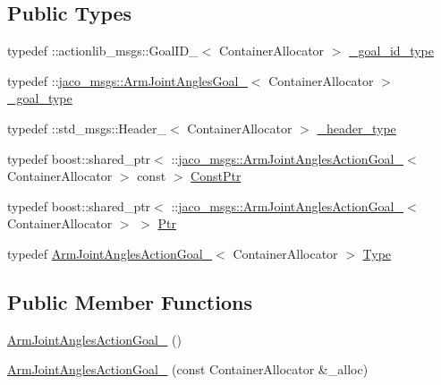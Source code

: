 \subsection*{Public Types}
\begin{DoxyCompactItemize}
\item 
typedef \+::actionlib\+\_\+msgs\+::\+Goal\+I\+D\+\_\+$<$ Container\+Allocator $>$ \hyperlink{structjaco__msgs_1_1ArmJointAnglesActionGoal___aa65aa60f77df79b587a07808da34d260}{\+\_\+goal\+\_\+id\+\_\+type}
\item 
typedef \+::\hyperlink{structjaco__msgs_1_1ArmJointAnglesGoal__}{jaco\+\_\+msgs\+::\+Arm\+Joint\+Angles\+Goal\+\_\+}$<$ Container\+Allocator $>$ \hyperlink{structjaco__msgs_1_1ArmJointAnglesActionGoal___a9db4408e5eda0965ab7c3334e53a7a24}{\+\_\+goal\+\_\+type}
\item 
typedef \+::std\+\_\+msgs\+::\+Header\+\_\+$<$ Container\+Allocator $>$ \hyperlink{structjaco__msgs_1_1ArmJointAnglesActionGoal___a43ebc2f136a276a4506784e53fd194ae}{\+\_\+header\+\_\+type}
\item 
typedef boost\+::shared\+\_\+ptr$<$ \+::\hyperlink{structjaco__msgs_1_1ArmJointAnglesActionGoal__}{jaco\+\_\+msgs\+::\+Arm\+Joint\+Angles\+Action\+Goal\+\_\+}$<$ Container\+Allocator $>$ const  $>$ \hyperlink{structjaco__msgs_1_1ArmJointAnglesActionGoal___affcfb0c481ae59a0e5248baa9eeb732c}{Const\+Ptr}
\item 
typedef boost\+::shared\+\_\+ptr$<$ \+::\hyperlink{structjaco__msgs_1_1ArmJointAnglesActionGoal__}{jaco\+\_\+msgs\+::\+Arm\+Joint\+Angles\+Action\+Goal\+\_\+}$<$ Container\+Allocator $>$ $>$ \hyperlink{structjaco__msgs_1_1ArmJointAnglesActionGoal___addabada996cc8b4897c127b45dfe0ea3}{Ptr}
\item 
typedef \hyperlink{structjaco__msgs_1_1ArmJointAnglesActionGoal__}{Arm\+Joint\+Angles\+Action\+Goal\+\_\+}$<$ Container\+Allocator $>$ \hyperlink{structjaco__msgs_1_1ArmJointAnglesActionGoal___abf48ee58a18a9c1669c62c0701f3cce3}{Type}
\end{DoxyCompactItemize}
\subsection*{Public Member Functions}
\begin{DoxyCompactItemize}
\item 
\hyperlink{structjaco__msgs_1_1ArmJointAnglesActionGoal___a5c5ea048b3faddb2cf1346a1f85e7877}{Arm\+Joint\+Angles\+Action\+Goal\+\_\+} ()
\item 
\hyperlink{structjaco__msgs_1_1ArmJointAnglesActionGoal___ad945d8d5f0e44334ae8f877c2ed98522}{Arm\+Joint\+Angles\+Action\+Goal\+\_\+} (const Container\+Allocator \&\+\_\+alloc)
\end{DoxyCompactItemize}
